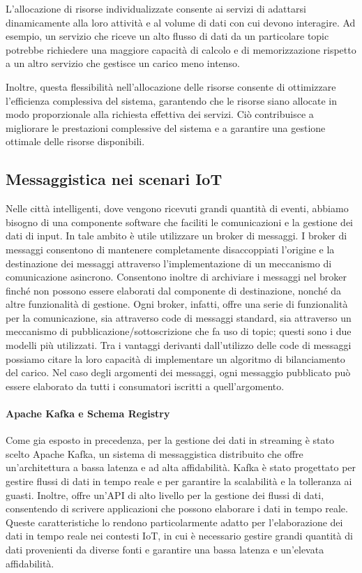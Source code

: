 L'allocazione di risorse individualizzate consente ai servizi di adattarsi dinamicamente alla loro attività e al volume di dati con cui devono interagire. Ad esempio, un servizio che riceve un alto flusso di dati da un particolare topic potrebbe richiedere una maggiore capacità di calcolo e di memorizzazione rispetto a un altro servizio che gestisce un carico meno intenso.

Inoltre, questa flessibilità nell'allocazione delle risorse consente di ottimizzare l'efficienza complessiva del sistema, garantendo che le risorse siano allocate in modo proporzionale alla richiesta effettiva dei servizi. Ciò contribuisce a migliorare le prestazioni complessive del sistema e a garantire una gestione ottimale delle risorse disponibili.

\subsection{Messaggistica nei scenari IoT}
Nelle città intelligenti, dove vengono ricevuti grandi quantità di eventi, abbiamo bisogno di una componente software che faciliti le comunicazioni e la gestione dei dati di input. In tale ambito è utile utilizzare un broker di messaggi. I broker di messaggi consentono di mantenere completamente disaccoppiati l'origine e la destinazione dei messaggi attraverso l'implementazione di un meccanismo di comunicazione asincrono. Consentono inoltre di archiviare i messaggi nel broker finché non possono essere elaborati dal componente di destinazione, nonché da altre funzionalità di gestione. Ogni broker, infatti, offre una serie di funzionalità per la comunicazione, sia attraverso code di messaggi standard, sia attraverso un meccanismo di pubblicazione/sottoscrizione che fa uso di topic; questi sono i due modelli più utilizzati. Tra i vantaggi derivanti dall'utilizzo delle code di messaggi possiamo citare la loro capacità di implementare un algoritmo di bilanciamento del carico. Nel caso degli argomenti dei messaggi, ogni messaggio pubblicato può essere elaborato da tutti i consumatori iscritti a quell'argomento.

\paragraph{Apache Kafka e Schema Registry}
Come gia esposto in precedenza, per la gestione dei dati in streaming è stato scelto Apache Kafka, un sistema di messaggistica distribuito che offre un'architettura a bassa latenza e ad alta affidabilità. Kafka è stato progettato per gestire flussi di dati in tempo reale e per garantire la scalabilità e la tolleranza ai guasti. Inoltre, offre un'API di alto livello per la gestione dei flussi di dati, consentendo di scrivere applicazioni che possono elaborare i dati in tempo reale. Queste caratteristiche lo rendono particolarmente adatto per l'elaborazione dei dati in tempo reale nei contesti IoT, in cui è necessario gestire grandi quantità di dati provenienti da diverse fonti e garantire una bassa latenza e un'elevata affidabilità.

